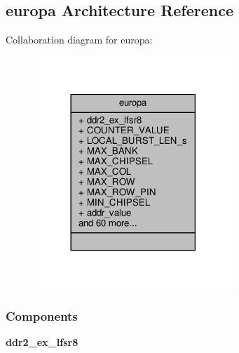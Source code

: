 \subsection{europa Architecture Reference}
\label{classddr2__example__driver_1_1europa}


Collaboration diagram for europa\+:\nopagebreak
\begin{figure}[H]
\begin{center}
\leavevmode
\includegraphics[width=213pt]{de/de8/classddr2__example__driver_1_1europa__coll__graph}
\end{center}
\end{figure}
\subsubsection*{Components}
 \begin{DoxyCompactItemize}
\item 
{\bf ddr2\+\_\+ex\+\_\+lfsr8}  {\bfseries }  
\end{DoxyCompactItemize}
